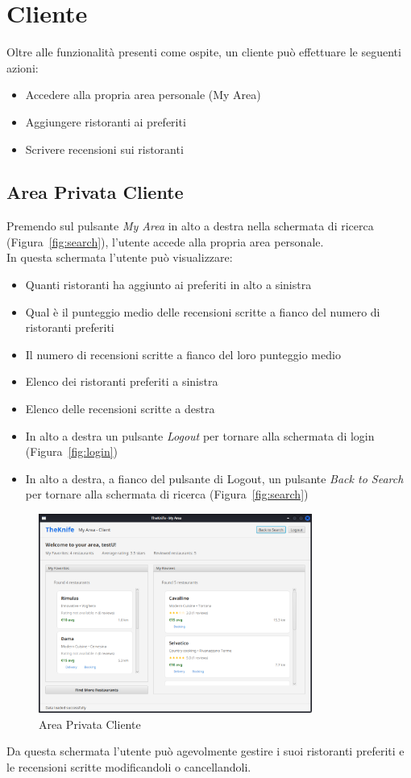 \section{Cliente}
Oltre alle funzionalità presenti come ospite, un cliente può effettuare 
le seguenti azioni:
\begin{itemize}
    \item Accedere alla propria area personale (My Area)
    \item Aggiungere ristoranti ai preferiti
    \item Scrivere recensioni sui ristoranti
\end{itemize}

\subsection{Area Privata Cliente}
Premendo sul pulsante \emph{My Area} in alto a destra nella schermata 
di ricerca (Figura~\ref{fig:search}), l'utente accede alla propria area personale.\\
In questa schermata l'utente può visualizzare:
\begin{itemize}
    \item Quanti ristoranti ha aggiunto ai preferiti in alto a sinistra
    \item Qual è il punteggio medio delle recensioni scritte a fianco del numero di ristoranti preferiti
    \item Il numero di recensioni scritte a fianco del loro punteggio medio
    \item Elenco dei ristoranti preferiti a sinistra
    \item Elenco delle recensioni scritte a destra
    \item In alto a destra un pulsante \emph{Logout} per tornare alla schermata di login (Figura~\ref{fig:login})
    \item In alto a destra, a fianco del pulsante di Logout, 
    un pulsante \emph{Back to Search} per tornare alla 
    schermata di ricerca (Figura~\ref{fig:search})
\end{itemize}

\begin{figure}[H]
    \centering
    \includegraphics[width=0.8\textwidth]{images/myarea-client.png}
    \caption{Area Privata Cliente}
    \label{fig:myarea-client}
\end{figure}
Da questa schermata l'utente può agevolmente gestire i suoi ristoranti 
preferiti e le recensioni scritte modificandoli o cancellandoli.
